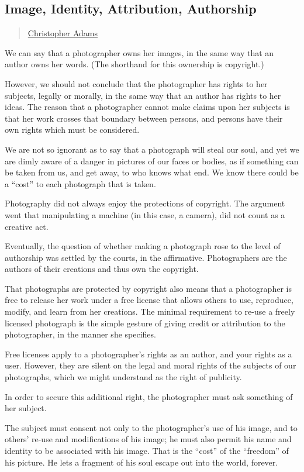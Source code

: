 \subsection{Image, Identity, Attribution,
Authorship}\label{image-identity-attribution-authorship}

\begin{quote}
\href{../appendix/attributions.html\#christopher-adams}{Christopher
Adams}
\end{quote}

We can say that a photographer owns her images, in the same way that an
author owns her words. (The shorthand for this ownership is copyright.)

However, we should not conclude that the photographer has rights to her
subjects, legally or morally, in the same way that an author has rights
to her ideas. The reason that a photographer cannot make claims upon her
subjects is that her work crosses that boundary between persons, and
persons have their own rights which must be considered.

We are not so ignorant as to say that a photograph will steal our soul,
and yet we are dimly aware of a danger in pictures of our faces or
bodies, as if something can be taken from us, and get away, to who knows
what end. We know there could be a ``cost'' to each photograph that is
taken.

Photography did not always enjoy the protections of copyright. The
argument went that manipulating a machine (in this case, a camera), did
not count as a creative act.

Eventually, the question of whether making a photograph rose to the
level of authorship was settled by the courts, in the affirmative.
Photographers are the authors of their creations and thus own the
copyright.

That photographs are protected by copyright also means that a
photographer is free to release her work under a free license that
allows others to use, reproduce, modify, and learn from her creations.
The minimal requirement to re-use a freely licensed photograph is the
simple gesture of giving credit or attribution to the photographer, in
the manner she specifies.

Free licenses apply to a photographer's rights as an author, and your
rights as a user. However, they are silent on the legal and moral rights
of the subjects of our photographs, which we might understand as the
right of publicity.

In order to secure this additional right, the photographer must ask
something of her subject.

The subject must consent not only to the photographer's use of his
image, and to others' re-use and modifications of his image; he must
also permit his name and identity to be associated with his image. That
is the ``cost'' of the ``freedom'' of his picture. He lets a fragment of
his soul escape out into the world, forever.

